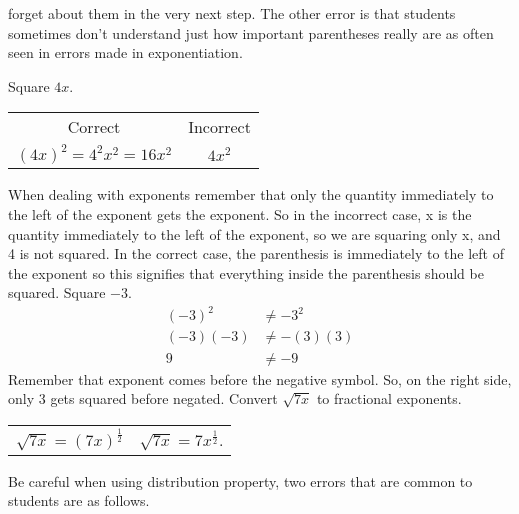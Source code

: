 forget about them in the very next step. The other error is that students sometimes don't
understand just how important parentheses really are as often seen in errors made in
exponentiation.
\begin{example}
\item Square $4x$.
\begin{center}
\begin{tabular}{cc}
Correct & Incorrect\\
$(4x)^2=4^2x^2=16x^2$ & $4x^2$\\
\end{tabular}
\end{center}
When dealing with exponents remember that only the quantity immediately to the
left of the exponent gets the exponent. So in the incorrect case, x is the quantity
immediately to the left of the exponent, so we are squaring only x, and 4 is not squared. In
the correct case, the parenthesis is immediately to the left of the exponent so this signifies
that everything inside the parenthesis should be squared.
\Item Square $-3$.
\begin{align*}
(-3)^2&\neq -3^2\\
(-3)(-3)&\neq -(3)(3)\\
9&\neq-9
\end{align*}
Remember that exponent comes before the negative symbol. So, on the right side,
only 3 gets squared before negated.
\Item Convert $\sqrt{7x}$ to fractional exponents.
\begin{center}
\begin{tabular}{cc}
$\sqrt{7x}=(7x)^\frac{1}{2}$ & $\sqrt{7x}=7x^\frac{1}{2}$.
\end{tabular}
\end{center}
\end{example}
 Be careful when using distribution property, two errors that are common to
students are as follows.
